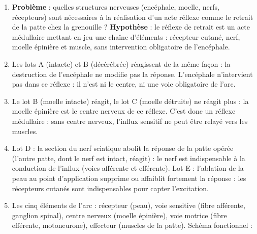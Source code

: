 \documentclass[11pt]{article}
\newcommand{\cle}[1]{{\popxbold\color{popdark}#1}}
\begin{document}
\begin{corrige}
\begin{enumerate}
\item \textbf{Problème} : quelles structures nerveuses (encéphale, moelle, nerfs, récepteurs) sont nécessaires à la réalisation d'un acte réflexe comme le retrait de la patte chez la grenouille ? \textbf{Hypothèse} : le réflexe de retrait est un acte médullaire mettant en jeu une chaîne d'éléments : récepteur cutané, nerf, moelle épinière et muscle, sans intervention obligatoire de l'encéphale.
\item Les lots A (intacte) et B (décérébrée) réagissent de la même façon : la destruction de l'encéphale ne modifie pas la réponse. L'\cle{encéphale n'intervient pas} dans ce réflexe : il n'est ni le centre, ni une voie obligatoire de l'arc.
\item Le lot B (moelle intacte) réagit, le lot C (moelle détruite) ne réagit plus : la \cle{moelle épinière est le centre nerveux} de ce réflexe. C'est donc un réflexe \cle{médullaire} : sans centre nerveux, l'influx sensitif ne peut être relayé vers les muscles.
\item Lot D : la section du nerf sciatique abolit la réponse de la patte opérée (l'autre patte, dont le nerf est intact, réagit) : le \cle{nerf est indispensable} à la conduction de l'influx (voies afférente et efférente). Lot E : l'ablation de la peau au point d'application supprime ou affaiblit fortement la réponse : les \cle{récepteurs cutanés} sont indispensables pour capter l'excitation.
\item Les cinq éléments de l'arc : \cle{récepteur} (peau), \cle{voie sensitive} (fibre afférente, ganglion spinal), \cle{centre nerveux} (moelle épinière), \cle{voie motrice} (fibre efférente, motoneurone), \cle{effecteur} (muscles de la patte). Schéma fonctionnel :
\begin{popfigure}
\end{popfigure}
\end{enumerate}
\end{corrige}
\end{document}
